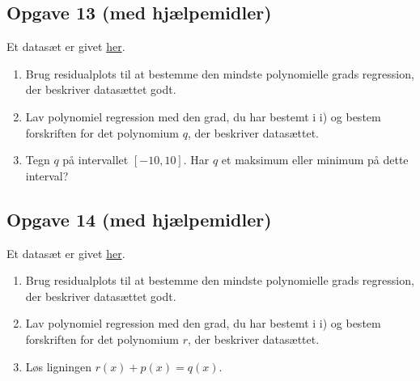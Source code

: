 \documentclass[12pt]{article}
\begin{document}
\subsection*{Opgave 13 (med hjælpemidler)}
	Et datasæt er givet \href{https://github.com/ChristianJLex/TeachingNotes/raw/master/2023-2024/Data og lign/poly_opgave5.xlsx}{\color{blue!60} her}.
	\begin{enumerate}[label=\roman*)]
		\item Brug residualplots til at bestemme den mindste polynomielle grads regression, 
		der beskriver datasættet godt. 
		\item Lav polynomiel regression med den grad, du har bestemt i i) og bestem 
		forskriften for det polynomium $q$, der beskriver datasættet.
		\item Tegn $q$ på intervallet $[-10,10]$. Har $q$ et maksimum eller minimum på dette interval?
	\end{enumerate}

\subsection*{Opgave 14 (med hjælpemidler)}
	Et datasæt er givet \href{https://github.com/ChristianJLex/TeachingNotes/raw/master/2023-2024/Data og lign/poly_opgave6.xlsx}{\color{blue!60} her}.
	\begin{enumerate}[label=\roman*)]
		\item Brug residualplots til at bestemme den mindste polynomielle grads regression, 
		der beskriver datasættet godt. 
		\item Lav polynomiel regression med den grad, du har bestemt i i) og bestem 
		forskriften for det polynomium $r$, der beskriver datasættet.
		\item Løs ligningen $r(x) + p(x) = q(x)$.
	\end{enumerate}
\end{document}
